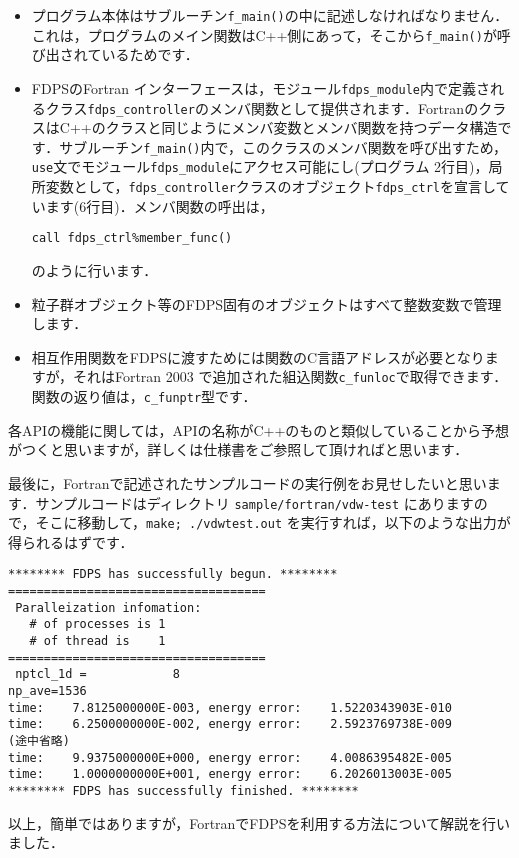 \documentclass[twocolumn,10pt]{jarticle}
\begin{document}
\begin{itemize}
\item プログラム本体はサブルーチン\texttt{f\_main()}の中に記述しなければなりません．これは，プログラムのメイン関数はC++側にあって，そこから\texttt{f\_main()}が呼び出されているためです．
\item FDPSのFortran インターフェースは，モジュール\texttt{fdps\_module}内で定義されるクラス\texttt{fdps\_controller}のメンバ関数として提供されます．FortranのクラスはC++のクラスと同じようにメンバ変数とメンバ関数を持つデータ構造です．サブルーチン\texttt{f\_main()}内で，このクラスのメンバ関数を呼び出すため，\texttt{use}文でモジュール\texttt{fdps\_module}にアクセス可能にし(プログラム 2行目)，局所変数として，\texttt{fdps\_controller}クラスのオブジェクト\texttt{fdps\_ctrl}を宣言しています(6行目)．メンバ関数の呼出は，
\begin{verbatim}
call fdps_ctrl%member_func()  
\end{verbatim}
のように行います．
\item 粒子群オブジェクト等のFDPS固有のオブジェクトはすべて整数変数で管理します．
\item 相互作用関数をFDPSに渡すためには関数のC言語アドレスが必要となりますが，それはFortran 2003 で追加された組込関数\texttt{c\_funloc}で取得できます．関数の返り値は，\texttt{c\_funptr}型です．
\end{itemize}

各APIの機能に関しては，APIの名称がC++のものと類似していることから予想がつくと思いますが，詳しくは仕様書をご参照して頂ければと思います．

最後に，Fortranで記述されたサンプルコードの実行例をお見せしたいと思います．サンプルコードはディレクトリ \texttt{sample/fortran/vdw-test} にありますので，そこに移動して，\texttt{make; ./vdwtest.out} を実行すれば，以下のような出力が得られるはずです．
{\scriptsize
\begin{verbatim}
******** FDPS has successfully begun. ********
====================================
 Paralleization infomation:
   # of processes is 1
   # of thread is    1
====================================
 nptcl_1d =            8
np_ave=1536
time:    7.8125000000E-003, energy error:    1.5220343903E-010
time:    6.2500000000E-002, energy error:    2.5923769738E-009
(途中省略)
time:    9.9375000000E+000, energy error:    4.0086395482E-005
time:    1.0000000000E+001, energy error:    6.2026013003E-005
******** FDPS has successfully finished. ********
\end{verbatim}
}\noindent
以上，簡単ではありますが，FortranでFDPSを利用する方法について解説を行いました．
\end{document}
